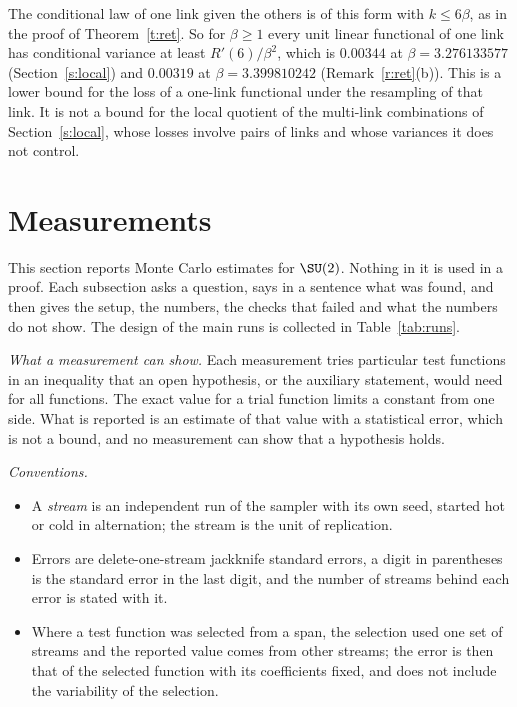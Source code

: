 \begin{remark}\label{r:haar}
The conditional law of one link given the others is of this form with $k\le6\beta$, as in the proof of
Theorem~\ref{t:ret}. So for $\beta\ge1$ every unit linear functional of one link has conditional variance at
least $R'(6)/\beta^2$, which is $0.00344$ at $\beta=3.276133577$ (Section~\ref{s:local}) and $0.00319$ at
$\beta=3.399810242$ (Remark~\ref{r:ret}(b)). This is
a lower bound for the loss of a one-link functional under the resampling of that link. It is not a bound for
the local quotient of the multi-link combinations of Section~\ref{s:local}, whose losses involve pairs of
links and whose variances it does not control.
\end{remark}

\section{Measurements}\label{s:evid}
This section reports Monte Carlo estimates for $\SU(2)$. Nothing in it is used in a proof. Each subsection
asks a question, says in a sentence what was found, and then gives the setup, the numbers, the checks that
failed and what the numbers do not show. The design of the main runs is collected in Table~\ref{tab:runs}.

\emph{What a measurement can show.} Each measurement tries particular test functions in an inequality that an
open hypothesis, or the auxiliary statement, would need for all functions. The exact value for a trial
function limits a constant from one side. What is reported is an estimate of that value with a statistical
error, which is not a bound, and no measurement can show that a hypothesis holds.

\emph{Conventions.}
\begin{itemize}
\item A \emph{stream} is an independent run of the sampler with its own seed, started hot or cold in
alternation; the stream is the unit of replication.
\item Errors are delete-one-stream jackknife standard errors, a digit in parentheses is the standard error in
the last digit, and the number of streams behind each error is stated with it.
\item Where a test function was selected from a span, the selection used one set of streams and the reported
value comes from other streams; the error is then that of the selected function with its coefficients fixed,
and does not include the variability of the selection.
\end{itemize}

